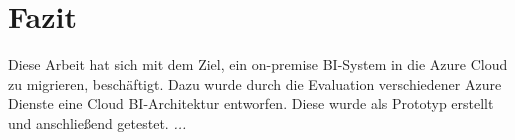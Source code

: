 \chapter{Fazit} \label{ch:zusammenfassung}
Diese Arbeit hat sich mit dem Ziel, ein on-premise BI-System in die Azure Cloud zu migrieren, beschäftigt. Dazu wurde durch die Evaluation verschiedener Azure Dienste eine Cloud BI-Architektur entworfen. Diese wurde als Prototyp erstellt und anschließend getestet.
\textit{...}